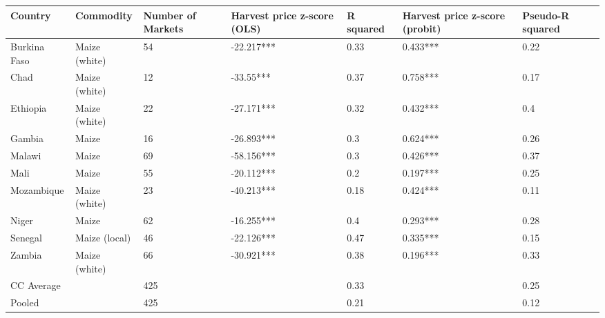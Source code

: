 \begin{table}[ht]
\centering
\begin{tabular}{lllllll}
  \hline
Country & Commodity & Number of Markets & Harvest price z-score (OLS) & R squared & Harvest price z-score (probit) & Pseudo-R squared \\ 
  \hline
Burkina Faso & Maize (white) & 54 & -22.217*** & 0.33 & 0.433*** & 0.22 \\ 
  Chad & Maize (white) & 12 & -33.55*** & 0.37 & 0.758*** & 0.17 \\ 
  Ethiopia & Maize (white) & 22 & -27.171*** & 0.32 & 0.432*** & 0.4 \\ 
  Gambia & Maize & 16 & -26.893*** & 0.3 & 0.624*** & 0.26 \\ 
  Malawi & Maize & 69 & -58.156*** & 0.3 & 0.426*** & 0.37 \\ 
  Mali & Maize & 55 & -20.112*** & 0.2 & 0.197*** & 0.25 \\ 
  Mozambique & Maize (white) & 23 & -40.213*** & 0.18 & 0.424*** & 0.11 \\ 
  Niger & Maize & 62 & -16.255*** & 0.4 & 0.293*** & 0.28 \\ 
  Senegal & Maize (local) & 46 & -22.126*** & 0.47 & 0.335*** & 0.15 \\ 
  Zambia & Maize (white) & 66 & -30.921*** & 0.38 & 0.196*** & 0.33 \\ 
  CC Average &  & 425 &  & 0.33 &  & 0.25 \\ 
  Pooled &  & 425 &  & 0.21 &  & 0.12 \\ 
   \hline
\end{tabular}
\end{table}
